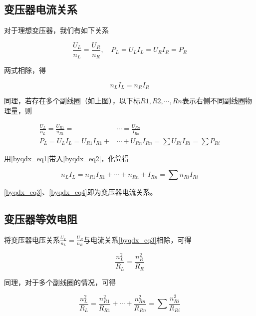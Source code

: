 \subsection{变压器电流关系}

对于理想变压器，我们有如下关系

$$\frac{U_L}{n_L} = \frac{U_R}{n_R}, \quad P_L = U_L I_L = U_R I_R = P_R$$

两式相除，得

\begin{equation}
\label{byqdx_eq3}
\boxed{n_L I_L = n_R I_R}
\end{equation}



同理，若存在多个副线圈（如上图），以下标$R1,R2,\cdots,Rn$表示右侧不同副线圈物理量，则

\begin{subequations}
\begin{align}
\label{byqdx_eq1}
\frac{U_L}{n_L} = \frac{U_{R1}}{n_{R1}} = & \cdots = \frac{U_{Rn}}{I_{Rn}} \\
\label{byqdx_eq2}
P_L = U_L I_L = U_{R1} I_{R1} + & \cdots + U_{Rn} I_{Rn} = \sum U_{Ri} I_{Ri}= \sum P_{Ri}
\end{align}
\end{subequations}

用\eqref{byqdx_eq1}带入\eqref{byqdx_eq2}，化简得

\begin{equation}
\label{byqdx_eq4}
\boxed{n_L I_L = n_{R1} I_{R1} + \cdots + n_{Rn} + I_{Rn} = \sum n_{Ri} I_{Ri}}
\end{equation}

\eqref{byqdx_eq3}、\eqref{byqdx_eq4}即为变压器电流关系。

\subsection{变压器等效电阻}

将变压器电压关系$\frac{U_L}{n_L} = \frac{U_R}{n_R}$与电流关系\eqref{byqdx_eq3}相除，可得

\begin{equation}
\label{byqdx_eq5}
\boxed{\frac{n_{L}^2}{R_L}=\frac{n_{R}^2}{R_R}}
\end{equation}

同理，对于多个副线圈的情况，可得

\begin{equation}
\label{byqdx_eq6}
\boxed{\frac{n_{L}^2}{R_L} =\frac{n_{R1}^2}{R_{R1}} + \cdots + \frac{n_{Rn}^2}{R_{Rn}} = \sum \frac{n_{Ri}^2}{R_{Ri}}}
\end{equation}

